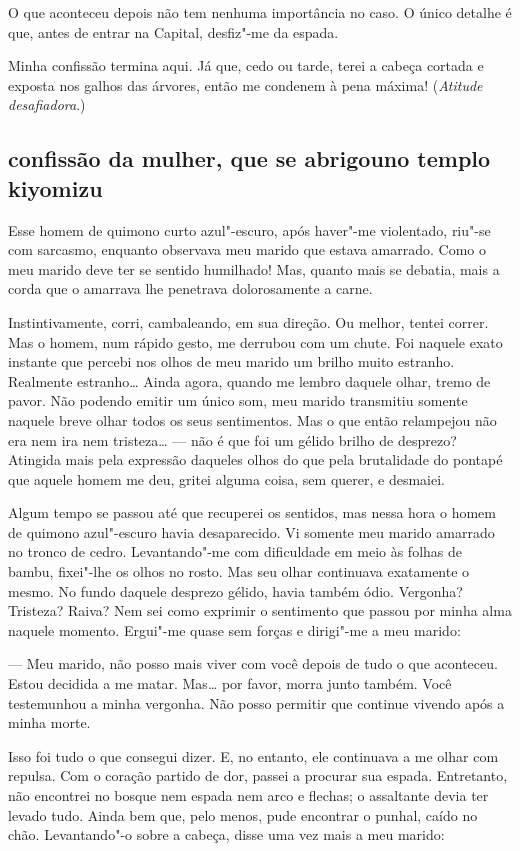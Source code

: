 O que aconteceu depois não tem nenhuma importância no caso. O único
detalhe é que, antes de entrar na Capital, desfiz"-me da espada.

Minha confissão termina aqui. Já que, cedo ou tarde, terei a cabeça
cortada e exposta nos galhos das árvores, então me condenem à pena
máxima! (\textit{Atitude desafiadora}.)

\subsection*{confissão da mulher, que se abrigou\break no templo kiyomizu}

Esse homem de quimono curto azul"-escuro, após haver"-me violentado,
riu"-se com sarcasmo, enquanto observava meu marido que estava amarrado.
Como o meu marido deve ter se sentido humilhado! Mas, quanto mais se
debatia, mais a corda que o amarrava lhe penetrava dolorosamente a
carne.

Instintivamente, corri, cambaleando, em sua direção. Ou melhor, tentei
correr. Mas o homem, num rápido gesto, me derrubou com um chute. Foi
naquele exato instante que percebi nos olhos de meu marido um brilho
muito estranho. Realmente estranho\ldots{} Ainda agora, quando me lembro
daquele olhar, tremo de pavor. Não podendo emitir um único som, meu
marido transmitiu somente naquele breve olhar todos os seus
sentimentos. Mas o que então relampejou não era nem ira nem tristeza\ldots{} 
--- não é que foi um gélido brilho de desprezo? Atingida mais pela
expressão daqueles olhos do que pela brutalidade do pontapé que aquele
homem me deu, gritei alguma coisa, sem querer, e desmaiei.

Algum tempo se passou até que recuperei os sentidos, mas nessa hora o
homem de quimono azul"-escuro havia desaparecido. Vi somente meu marido
amarrado no tronco de cedro. Levantando"-me com dificuldade em meio às
folhas de bambu, fixei"-lhe os olhos no rosto. Mas seu olhar continuava
exatamente o mesmo. No fundo daquele desprezo gélido, havia também
ódio. Vergonha? Tristeza? Raiva? Nem sei como exprimir o sentimento que
passou por minha alma naquele momento. Ergui"-me quase sem forças e
dirigi"-me a meu marido:

--- Meu marido, não posso mais viver com você depois de tudo o que
aconteceu. Estou decidida a me matar. Mas\ldots{} por favor, morra junto
também. Você testemunhou a minha vergonha. Não posso permitir que
continue vivendo após a minha morte.					

Isso foi tudo o que consegui dizer. E, no entanto, ele continuava a me
olhar com repulsa. Com o coração partido de dor, passei a procurar sua
espada. Entretanto, não encontrei no bosque nem espada nem arco e
flechas; o assaltante devia ter levado tudo. Ainda bem que, pelo menos,
pude encontrar o punhal, caído no chão. Levantando"-o sobre a cabeça,
disse uma vez mais a meu marido:

